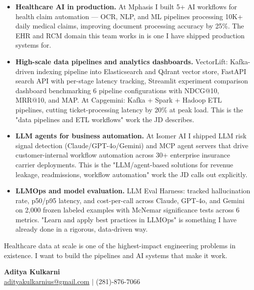 \documentclass[11pt,letterpaper]{article}
\begin{document}
\begin{itemize}
  \item[\faAngleRight] \textbf{Healthcare AI in production.} At Mphasis I built 5+ AI workflows for health claim automation --- OCR, NLP, and ML pipelines processing 10K+ daily medical claims, improving document processing accuracy by 25\%. The EHR and RCM domain this team works in is one I have shipped production systems for.

  \item[\faAngleRight] \textbf{High-scale data pipelines and analytics dashboards.} VectorLift: Kafka-driven indexing pipeline into Elasticsearch and Qdrant vector store, FastAPI search API with per-stage latency tracking, Streamlit experiment comparison dashboard benchmarking 6 pipeline configurations with NDCG@10, MRR@10, and MAP. At Capgemini: Kafka + Spark + Hadoop ETL pipelines, cutting ticket-processing latency by 20\% at peak load. This is the "data pipelines and ETL workflows" work the JD describes.

  \item[\faAngleRight] \textbf{LLM agents for business automation.} At Isomer AI I shipped LLM risk signal detection (Claude/GPT-4o/Gemini) and MCP agent servers that drive customer-internal workflow automation across 30+ enterprise insurance carrier deployments. This is the "LLM/agent-based solutions for revenue leakage, readmissions, workflow automation" work the JD calls out explicitly.

  \item[\faAngleRight] \textbf{LLMOps and model evaluation.} LLM Eval Harness: tracked hallucination rate, p50/p95 latency, and cost-per-call across Claude, GPT-4o, and Gemini on 2,000 frozen labeled examples with McNemar significance tests across 6 metrics. "Learn and apply best practices in LLMOps" is something I have already done in a rigorous, data-driven way.
\end{itemize}

\vspace{8pt}

Healthcare data at scale is one of the highest-impact engineering problems in existence. I want to build the pipelines and AI systems that make it work.

\vspace{12pt}

{\color{OracleRed} \textbf{Aditya Kulkarni}} \\
\href{mailto:adityakulkarnius@gmail.com}{adityakulkarnius@gmail.com} \quad $|$ \quad (281)-876-7066
\end{document}
